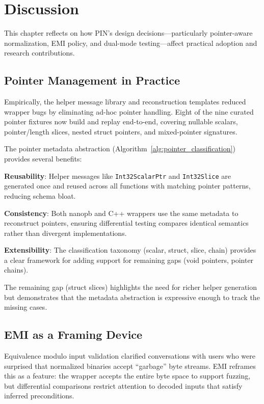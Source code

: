 \documentclass[doublespace,nopageskip]{VTthesis}
\begin{document}
\chapter{Discussion} \label{ch:discussion}

This chapter reflects on how PIN's design decisions---particularly pointer-aware normalization, EMI policy, and dual-mode testing---affect practical adoption and research contributions.

\section{Pointer Management in Practice} \label{se:pointer_management_practice}

Empirically, the helper message library and reconstruction templates reduced wrapper bugs by eliminating ad-hoc pointer handling. Eight of the nine curated pointer fixtures now build and replay end-to-end, covering nullable scalars, pointer/length slices, nested struct pointers, and mixed-pointer signatures.

The pointer metadata abstraction (Algorithm~\ref{alg:pointer_classification}) provides several benefits:

\textbf{Reusability}: Helper messages like \texttt{Int32ScalarPtr} and \texttt{Int32Slice} are generated once and reused across all functions with matching pointer patterns, reducing schema bloat.

\textbf{Consistency}: Both nanopb and C++ wrappers use the same metadata to reconstruct pointers, ensuring differential testing compares identical semantics rather than divergent implementations.

\textbf{Extensibility}: The classification taxonomy (scalar, struct, slice, chain) provides a clear framework for adding support for remaining gaps (void pointers, pointer chains).

The remaining gap (struct slices) highlights the need for richer helper generation but demonstrates that the metadata abstraction is expressive enough to track the missing cases.

\section{EMI as a Framing Device} \label{se:emi_framing}

Equivalence modulo input validation clarified conversations with users who were surprised that normalized binaries accept ``garbage'' byte streams. EMI reframes this as a feature: the wrapper accepts the entire byte space to support fuzzing, but differential comparisons restrict attention to decoded inputs that satisfy inferred preconditions.
\end{document}

